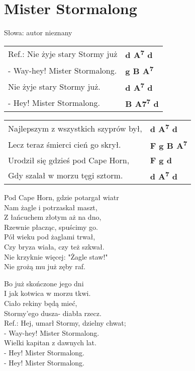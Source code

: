 \section{Mister Stormalong}

Słowa:  autor nieznany\\

\vspace{2em}
\begin{tabular}{@{}p{7cm}@{}l@{}}
Ref.: Nie żyje stary Stormy już & \bfseries d A\textsuperscript{7} d \\
- Way-hey! Mister Stormalong. & \bfseries g B A\textsuperscript{7} \\
Nie żyje stary Stormy już. & \bfseries d A\textsuperscript{7} d \\
- Hey! Mister Stormalong. & \bfseries B A7\textsuperscript{7} d \\
\end{tabular}

\vspace{1em}
\begin{tabular}{@{}p{7cm}@{}l@{}}
Najlepszym z wszystkich szyprów był, & \bfseries  d A\textsuperscript{7} d \\
Lecz teraz śmierci cień go skrył. & \bfseries  F g B A\textsuperscript{7} \\
Urodził się gdzieś pod Cape Horn, & \bfseries  F g d \\
Gdy szalał w morzu tęgi sztorm. & \bfseries  d A\textsuperscript{7} d \\
\end{tabular}

\vspace{1em}
Pod Cape Horn, gdzie potargał wiatr \\
Nam żagle i potrzaskał maszt, \\
Z łańcuchem złotym aż na dno, \\
Rzewnie płacząc, spuścimy go. \\

Pół wieku pod żaglami trwał, \\
Czy bryza wiała, czy też szkwał. \\
Nie krzyknie więcej: "Żagle staw!" \\
Nie grożą mu już zęby raf. \\

\begin{multicols}{2}
Bo już skończone jego dni \\
I jak kotwica w morzu tkwi. \\
Ciało rekiny będą mieć, \\
Stormy'ego dusza- diabła rzecz. \\

Ref.: Hej, umarł Stormy, dzielny chwat; \\
- Way-hey! Mister Stormalong. \\
Wielki kapitan z dawnych lat. \\
- Hey! Mister Stormalong. \\
- Hey! Mister Stormalong. 
\end{multicols}